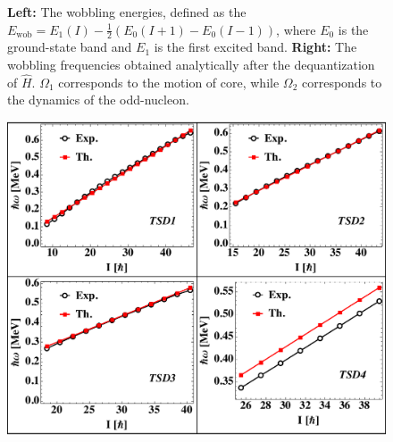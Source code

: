 \documentclass[final]{beamer}
\newlength{\colwidth}
\begin{document}
\begin{frame}[t]
\begin{columns}[t]
\begin{column}{\colwidth}
\begin{figure}
\begin{minipage}{.5\textwidth}
\end{minipage}
\caption{\textbf{Left:} The wobbling energies, defined as the $E_\text{wob}=E_1(I)-\frac{1}{2}(E_0(I+1)-E_0(I-1))$, where $E_0$ is the ground-state band and $E_1$ is the first excited band. \textbf{Right:} The wobbling frequencies obtained analytically after the dequantization of $\hat{H}$. $\Omega_1$ corresponds to the motion of core, while $\Omega_2$ corresponds to the dynamics of the odd-nucleon.}
    \label{wobb-energies}
\end{figure}
\begin{figure}
\centering
\begin{minipage}{.65\textwidth}
  \centering
  \includegraphics[scale=1.1]{images/rotFreqs.pdf}
\end{minipage}%
\begin{minipage}{.35\textwidth}
  \centering

\end{minipage}
\end{figure}
\end{column}
\end{columns}
\end{frame}
\end{document}
